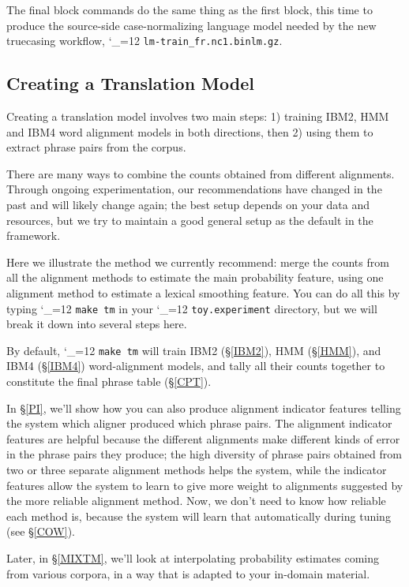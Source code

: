\documentclass[11pt,letterpaper]{article}
\def\code{\begingroup\catcode`\_=12 \codex}
\newcommand{\codex}[1]{\texttt{#1}\endgroup}
\begin{document}
The final block commands do the same thing as the first block, this time to
produce the source-side case-normalizing language model needed by the new
truecasing workflow, \code{lm-train_fr.nc1.binlm.gz}.

\subsection{Creating a Translation Model} \label{TM}

Creating a translation model involves two main steps: 1) training IBM2, HMM and
IBM4 word alignment models in both directions, then 2) using them to
extract phrase pairs from the corpus.

There are many ways to combine the counts obtained from different alignments.
Through ongoing experimentation, our recommendations have changed in the past
and will likely change again; the best setup depends on your data and
resources, but we try to maintain a good general setup as the default in the
framework.

Here we illustrate the method we currently recommend: merge the counts from all
the alignment methods to estimate the main probability feature, using one
alignment method to estimate a lexical smoothing feature.
You can do all this by typing \code{make tm} in your \code{toy.experiment}
directory, but we will break it down into several steps here.

By default, \code{make tm} will train IBM2 (\S\ref{IBM2}), HMM (\S\ref{HMM}),
and IBM4 (\S\ref{IBM4}) word-alignment models, and tally all their counts
together to constitute the final phrase table (\S\ref{CPT}).

In \S\ref{PI}, we'll show how you can also produce alignment indicator features
telling the system which aligner produced which phrase pairs.  The alignment
indicator features are helpful because the different alignments make different
kinds of error in the phrase pairs they produce; the high diversity of phrase
pairs obtained from two or three separate alignment methods helps the system,
while the indicator features allow the system to learn to give more weight to
alignments suggested by the more reliable alignment method.  Now, we don't need
to know how reliable each method is, because the system will learn that
automatically during tuning (see \S\ref{COW}).

Later, in \S\ref{MIXTM}, we'll look at interpolating probability estimates
coming from various corpora, in a way that is adapted to your in-domain
material.
\end{document}
